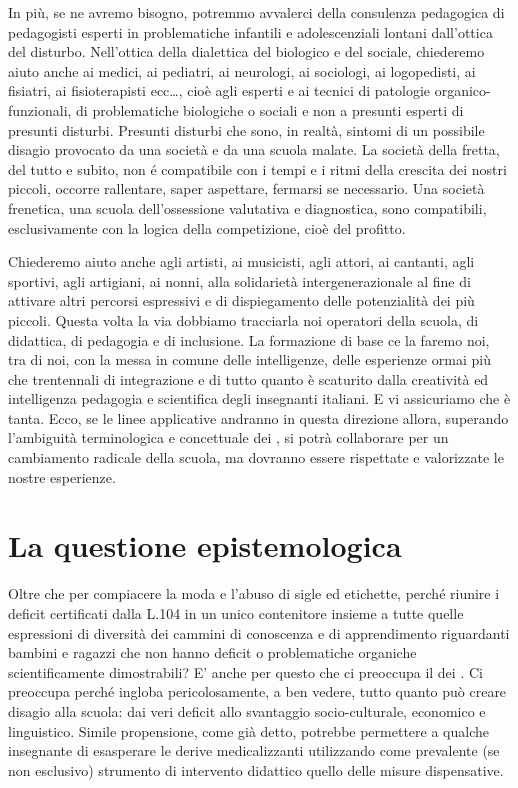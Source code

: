 In più, se ne avremo bisogno, potremmo avvalerci della consulenza pedagogica di pedagogisti esperti in problematiche infantili e adolescenziali lontani dall'ottica del disturbo. Nell'ottica della dialettica del biologico e del sociale, chiederemo aiuto anche ai medici, ai pediatri, ai neurologi, ai sociologi, ai logopedisti, ai fisiatri, ai fisioterapisti ecc\dots, cioè agli esperti e ai tecnici di patologie organico-funzionali, di problematiche biologiche o sociali e non a presunti esperti di presunti disturbi. Presunti disturbi che sono, in realtà, sintomi di un possibile disagio provocato da una società e da una scuola malate. La società della fretta, del tutto e subito, non é compatibile con i tempi e i ritmi della crescita dei nostri piccoli, occorre rallentare, saper aspettare, fermarsi se necessario. Una società frenetica, una scuola dell'ossessione valutativa e diagnostica, sono compatibili, esclusivamente con la logica della competizione, cioè del profitto.

Chiederemo aiuto anche agli artisti, ai musicisti, agli attori, ai cantanti, agli sportivi, agli artigiani, ai nonni, alla solidarietà intergenerazionale al fine di attivare altri percorsi espressivi e di dispiegamento delle potenzialità dei più piccoli. Questa volta la via dobbiamo tracciarla noi operatori della scuola,  di didattica, di pedagogia e di inclusione. La formazione di base ce la faremo noi, tra di noi, con la messa in comune delle intelligenze, delle esperienze ormai più che trentennali di integrazione e di tutto quanto è scaturito dalla creatività ed intelligenza pedagogia e scientifica degli insegnanti italiani. E vi assicuriamo che è tanta. Ecco, se le linee applicative andranno in questa direzione allora, superando l'ambiguità terminologica e concettuale dei , si potrà collaborare per un cambiamento radicale della scuola, ma dovranno essere rispettate e valorizzate le nostre esperienze.
\section*{La questione epistemologica}

Oltre che per compiacere la moda e l'abuso di sigle ed etichette, perché riunire i deficit certificati dalla L.104 in un unico contenitore insieme a tutte quelle espressioni di diversità dei cammini di conoscenza e di apprendimento riguardanti bambini e ragazzi che non hanno deficit o problematiche organiche scientificamente dimostrabili? E' anche per questo che ci preoccupa il  dei . Ci preoccupa perché ingloba pericolosamente, a ben vedere, tutto quanto può creare disagio alla scuola: dai veri deficit allo svantaggio socio-culturale, economico e linguistico. Simile propensione, come già detto, potrebbe permettere a qualche insegnante di esasperare le derive medicalizzanti utilizzando come prevalente (se non esclusivo) strumento di intervento didattico quello delle misure dispensative.

